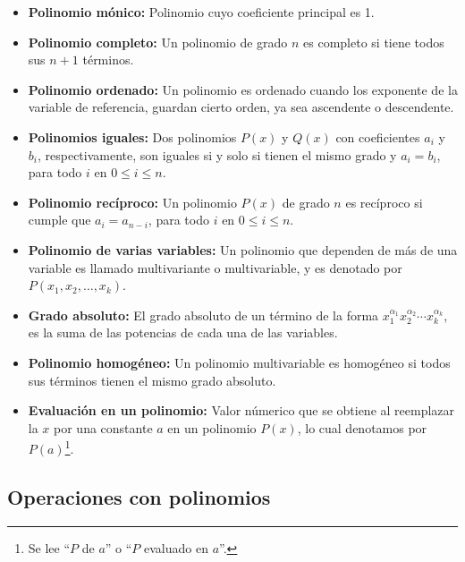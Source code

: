 \begin{itemize}
    \item \textbf{Polinomio mónico:} Polinomio cuyo coeficiente principal es 1.
    \item \textbf{Polinomio completo:} Un polinomio de grado $n$ es completo si tiene todos sus $n + 1$ términos.
    \item \textbf{Polinomio ordenado:} Un polinomio es ordenado cuando los exponente de la variable de referencia, guardan cierto orden, ya sea ascendente o descendente.
    \item \textbf{Polinomios iguales:} Dos polinomios $P(x)$ y $Q(x)$ con coeficientes $a_i$ y $b_i$, respectivamente, son iguales si y solo si tienen el mismo grado y $a_i = b_i$, para todo $i$ en $0\leq i\leq n$.
    \item \textbf{Polinomio recíproco:}\label{reci-polynomial} Un polinomio $P(x)$ de grado $n$ es recíproco si cumple que $a_i = a_{n-i}$, para todo $i$ en $0\leq i\leq n$.
    \item \textbf{Polinomio de varias variables:} Un polinomio que dependen de más de una variable es llamado multivariante o multivariable, y es denotado por $P(x_1, x_2, \dots, x_k)$.
    \item \textbf{Grado absoluto:} El grado absoluto de un término de la forma $x_1^{\alpha_1} x_2^{\alpha_2} \cdots x_k^{\alpha_k}$, es la suma de las potencias de cada una de las variables.
    \item \textbf{Polinomio homogéneo:} Un polinomio multivariable es homogéneo si todos sus términos tienen el mismo grado absoluto.
    \item \textbf{Evaluación en un polinomio:} Valor númerico que se obtiene al reemplazar la $x$ por una constante $a$ en un polinomio $P(x)$, lo cual denotamos por $P(a)$\footnote{Se lee ``$P$ de $a$'' o ``$P$ evaluado en $a$''.}.
\end{itemize}



\subsection{Operaciones con polinomios}

